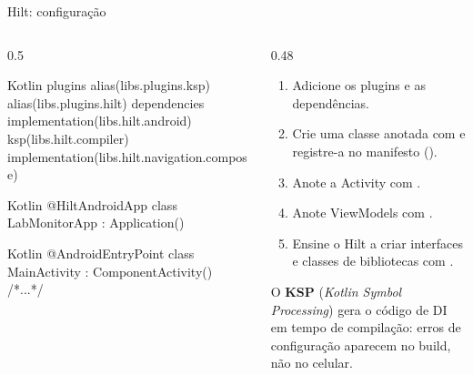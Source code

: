 \documentclass[aspectratio=169,10pt]{beamer}
\begin{document}
\begin{frame}[fragile]{Hilt: configuração}
  \begin{columns}[T]
    \begin{column}{0.5\textwidth}
\begin{codigo}[title=app/build.gradle.kts]{Kotlin}
plugins {
  alias(libs.plugins.ksp)
  alias(libs.plugins.hilt)
}
dependencies {
  implementation(libs.hilt.android)
  ksp(libs.hilt.compiler)
  implementation(libs.hilt.navigation.compose)
}
\end{codigo}
\begin{codigo}[title=LabMonitorApp.kt]{Kotlin}
@HiltAndroidApp
class LabMonitorApp : Application()
\end{codigo}
\begin{codigo}[title=MainActivity.kt]{Kotlin}
@AndroidEntryPoint
class MainActivity : ComponentActivity() { /*...*/ }
\end{codigo}
    \end{column}
    \begin{column}{0.48\textwidth}
      \begin{enumerate}
        \item Adicione os plugins e as dependências.
        \item Crie uma classe  anotada com  e registre-a no manifesto ().
        \item Anote a Activity com .
        \item Anote ViewModels com .
        \item Ensine o Hilt a criar interfaces e classes de bibliotecas com .
      \end{enumerate}
      \begin{dica}
        O \textbf{KSP} (\emph{Kotlin Symbol Processing}) gera o código de DI em tempo de compilação: erros de configuração aparecem no build, não no celular.
      \end{dica}
    \end{column}
  \end{columns}
\end{frame}
\end{document}
